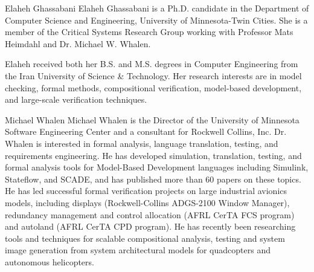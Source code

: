 \documentclass[10pt,journal,compsoc]{IEEEtran}
\begin{document}



\begin{IEEEbiography}{Elaheh Ghassabani}
Elaheh Ghassabani is a Ph.D. candidate in the Department of Computer Science and Engineering, University of Minnesota-Twin Cities. She is a member of the Critical Systems Research Group working with Professor Mats Heimdahl and Dr. Michael W. Whalen.

Elaheh received both her B.S. and M.S. degrees in Computer Engineering from the Iran University of Science \& Technology. Her research interests are in model checking, formal methods, compositional verification, model-based development, and large-scale verification techniques.

\end{IEEEbiography}

\begin{IEEEbiography}{Michael Whalen}
Michael Whalen is the Director of the University of Minnesota Software Engineering Center and a consultant for Rockwell Collins, Inc.  Dr. Whalen is interested in formal analysis, language translation, testing, and requirements engineering.  He has developed simulation, translation, testing, and formal analysis tools for Model-Based Development languages including Simulink, Stateflow, and SCADE, and has published more than 60 papers on these topics.  He has led successful formal verification projects on large industrial avionics models, including displays (Rockwell-Collins ADGS-2100 Window Manager), redundancy management and control allocation (AFRL CerTA FCS program) and autoland (AFRL CerTA CPD program).  He has recently been researching tools and techniques for scalable compositional analysis, testing and system image generation from system architectural models for quadcopters and autonomous helicopters.
\end{IEEEbiography}
\end{document}
